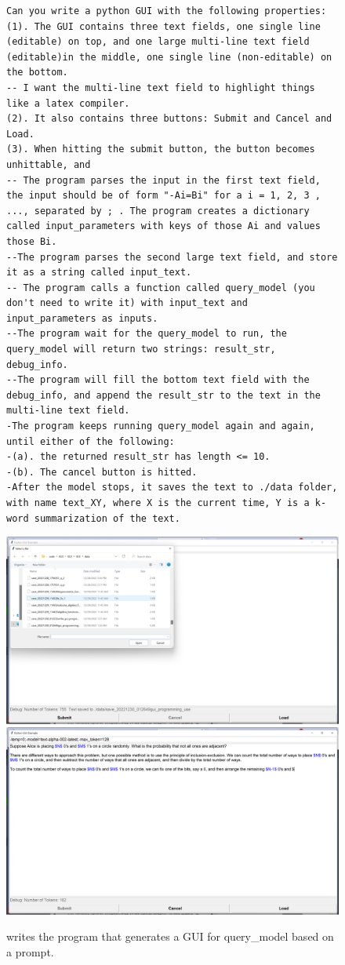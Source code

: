 \begin{figure}[H]
\begin{AIbox}{\DV}
\begin{verbatim}
Can you write a python GUI with the following properties:
(1). The GUI contains three text fields, one single line (editable) on top, and one large multi-line text field (editable)in the middle, one single line (non-editable) on the bottom.
-- I want the multi-line text field to highlight things like a latex compiler. 
(2). It also contains three buttons: Submit and Cancel and Load.
(3). When hitting the submit button, the button becomes unhittable, and 
-- The program parses the input in the first text field, the input should be of form "-Ai=Bi" for a i = 1, 2, 3 , ..., separated by ; . The program creates a dictionary called input_parameters with keys of those Ai and values those Bi.
--The program parses the second large text field, and store it as a string called input_text.  
-- The program calls a function called query_model (you don't need to write it) with input_text and input_parameters as inputs.
--The program wait for the query_model to run, the query_model will return two strings: result_str, debug_info.
--The program will fill the bottom text field with the debug_info, and append the result_str to the text in the multi-line text field. 
-The program keeps running query_model again and again, until either of the following:
-(a). the returned result_str has length <= 10.
-(b). The cancel button is hitted. 
-After the model stops, it saves the text to ./data folder, with name text_XY, where X is the current time, Y is a k-word summarization of the text.
\end{verbatim}

\includegraphics[width=0.45\linewidth]{figures/s1.png} \hfill \includegraphics[width=0.45\linewidth]{figures/s2.png}
\end{AIbox}
\caption{\DV writes the program that generates a GUI for query\_model based on a prompt.}
\end{figure}

